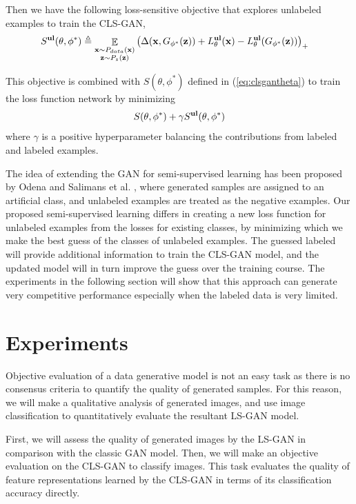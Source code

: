 Then we have the following loss-sensitive objective that explores unlabeled examples to train the CLS-GAN,
\begin{align}
&S^{\bf ul}(\theta,\phi^*) \triangleq
\mathop \mathbb E\limits_{\substack{\mathbf x\sim P_{data}(\mathbf x) \\\nonumber
\mathbf z\sim P_z(\mathbf z)}} \big(\Delta(\mathbf x, G_{\phi^*}(\mathbf z))+L_\theta^{\bf ul}(\mathbf x)-L_\theta^{\bf ul}(G_{\phi^*}(\mathbf z))\big)_+
\end{align}

This objective is combined with $S(\theta,\phi^*)$ defined in (\ref{eq:clsgantheta}) to train the loss function network by minimizing
$$
S(\theta,\phi^*)+\gamma S^{\bf ul}(\theta,\phi^*)
$$
where $\gamma$ is a positive hyperparameter balancing the contributions from labeled and labeled examples.

The idea of extending the GAN for semi-supervised learning has been proposed by Odena \cite{odena2016semi} and
Salimans et al. \cite{salimans2016improved}, where generated samples are assigned to an artificial class, and unlabeled examples are treated as the negative examples.
Our proposed semi-supervised learning differs in creating a new loss function for unlabeled examples from the losses for existing classes, by minimizing which we make the best guess of the classes of unlabeled examples. The guessed labeled will provide additional information to train the CLS-GAN model, and the updated model will in turn improve the guess over the training course.
The experiments in the following section will show that this approach can generate very competitive performance especially when the labeled data is very limited.

\section{Experiments}\label{sec:exp}

Objective evaluation of a data generative model is not an easy task as there is no consensus criteria to quantify the quality of generated samples.  For this reason, we will make a qualitative analysis of generated images, and use image classification to quantitatively evaluate the resultant LS-GAN model.

First, we will assess the quality of generated images by the LS-GAN in comparison with the classic GAN model. Then, we will make an objective evaluation on the CLS-GAN to classify images. This task evaluates the quality of feature representations learned by the CLS-GAN in terms of its classification accuracy directly. %

